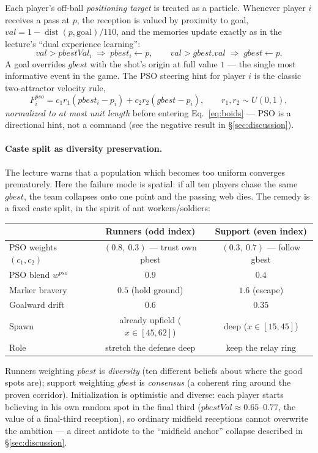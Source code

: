 \documentclass[11pt,a4paper]{article}
\begin{document}
Each player's off-ball \emph{positioning target} is treated as a particle. Whenever player $i$
receives a pass at $p$, the reception is valued by proximity to goal,
$val = 1 - \operatorname{dist}(p, \text{goal})/110$, and the memories update exactly as in the
lecture's ``dual experience learning'':
\[
  val > pbestVal_i \;\Rightarrow\; pbest_i \leftarrow p, \qquad
  val > gbest.val \;\Rightarrow\; gbest \leftarrow p .
\]
A goal overrides $gbest$ with the shot's origin at full value $1$ --- the single most
informative event in the game. The PSO steering hint for player $i$ is the classic two-attractor
velocity rule,
\begin{equation}\label{eq:pso}
  F^{pso}_i = c_1 r_1 (pbest_i - p_i) + c_2 r_2 (gbest - p_i), \qquad r_1, r_2 \sim U(0,1),
\end{equation}
\emph{normalized to at most unit length} before entering Eq.~\eqref{eq:boids} --- PSO is a
directional hint, not a command (see the negative result in \S\ref{sec:discussion}).

\paragraph{Caste split as diversity preservation.} The lecture warns that a population which
becomes too uniform converges prematurely. Here the failure mode is spatial: if all ten players
chase the same $gbest$, the team collapses onto one point and the passing web dies. The remedy
is a fixed caste split, in the spirit of ant workers/soldiers:
\begin{center}
\small
\begin{tabular}{@{}lcc@{}}
\toprule
 & \textbf{Runners (odd index)} & \textbf{Support (even index)}\\
\midrule
PSO weights $(c_1, c_2)$ & $(0.8,\ 0.3)$ --- trust own pbest & $(0.3,\ 0.7)$ --- follow gbest\\
PSO blend $w^{pso}$ & $0.9$ & $0.4$\\
Marker bravery & $0.5$ (hold ground) & $1.6$ (escape)\\
Goalward drift & $0.6$ & $0.35$\\
Spawn & already upfield ($x \in [45,62]$) & deep ($x \in [15,45]$)\\
Role & stretch the defense deep & keep the relay ring\\
\bottomrule
\end{tabular}
\end{center}
Runners weighting $pbest$ is \emph{diversity} (ten different beliefs about where the good spots
are); support weighting $gbest$ is \emph{consensus} (a coherent ring around the proven corridor).
Initialization is optimistic and diverse: each player starts believing in his own random spot in
the final third ($pbestVal \approx 0.65$--$0.77$, the value of a final-third reception), so
ordinary midfield receptions cannot overwrite the ambition --- a direct antidote to the
``midfield anchor'' collapse described in \S\ref{sec:discussion}.
\end{document}
